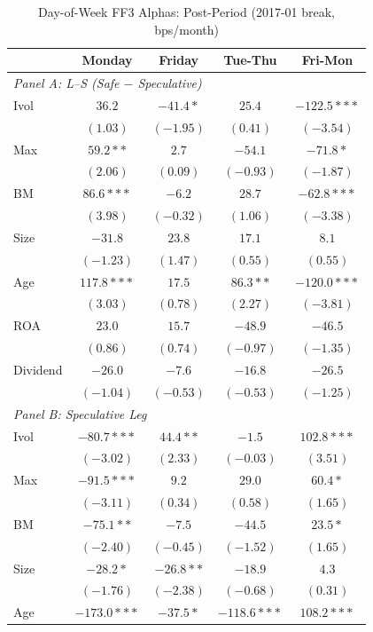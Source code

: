 \begin{table}[htbp]
\centering
\caption{Day-of-Week FF3 Alphas: Post-Period (2017-01 break, bps/month)}
\label{tab:split_ff3_201701_post_ff3}
\footnotesize
\begin{tabular}{l c c c c}
\toprule
 & Monday & Friday & Tue-Thu & Fri-Mon \\
\midrule
\multicolumn{5}{l}{\textit{Panel A: L--S (Safe $-$ Speculative)}} \\
Ivol & $36.2$ & $-41.4*$ & $25.4$ & $-122.5***$ \\
 & $(1.03)$ & $(-1.95)$ & $(0.41)$ & $(-3.54)$ \\
Max & $59.2**$ & $2.7$ & $-54.1$ & $-71.8*$ \\
 & $(2.06)$ & $(0.09)$ & $(-0.93)$ & $(-1.87)$ \\
BM & $86.6***$ & $-6.2$ & $28.7$ & $-62.8***$ \\
 & $(3.98)$ & $(-0.32)$ & $(1.06)$ & $(-3.38)$ \\
Size & $-31.8$ & $23.8$ & $17.1$ & $8.1$ \\
 & $(-1.23)$ & $(1.47)$ & $(0.55)$ & $(0.55)$ \\
Age & $117.8***$ & $17.5$ & $86.3**$ & $-120.0***$ \\
 & $(3.03)$ & $(0.78)$ & $(2.27)$ & $(-3.81)$ \\
ROA & $23.0$ & $15.7$ & $-48.9$ & $-46.5$ \\
 & $(0.86)$ & $(0.74)$ & $(-0.97)$ & $(-1.35)$ \\
Dividend & $-26.0$ & $-7.6$ & $-16.8$ & $-26.5$ \\
 & $(-1.04)$ & $(-0.53)$ & $(-0.53)$ & $(-1.25)$ \\
\midrule
\multicolumn{5}{l}{\textit{Panel B: Speculative Leg}} \\
Ivol & $-80.7***$ & $44.4**$ & $-1.5$ & $102.8***$ \\
 & $(-3.02)$ & $(2.33)$ & $(-0.03)$ & $(3.51)$ \\
Max & $-91.5***$ & $9.2$ & $29.0$ & $60.4*$ \\
 & $(-3.11)$ & $(0.34)$ & $(0.58)$ & $(1.65)$ \\
BM & $-75.1**$ & $-7.5$ & $-44.5$ & $23.5*$ \\
 & $(-2.40)$ & $(-0.45)$ & $(-1.52)$ & $(1.65)$ \\
Size & $-28.2*$ & $-26.8**$ & $-18.9$ & $4.3$ \\
 & $(-1.76)$ & $(-2.38)$ & $(-0.68)$ & $(0.31)$ \\
Age & $-173.0***$ & $-37.5*$ & $-118.6***$ & $108.2***$ \\

\end{tabular}
\end{table}
